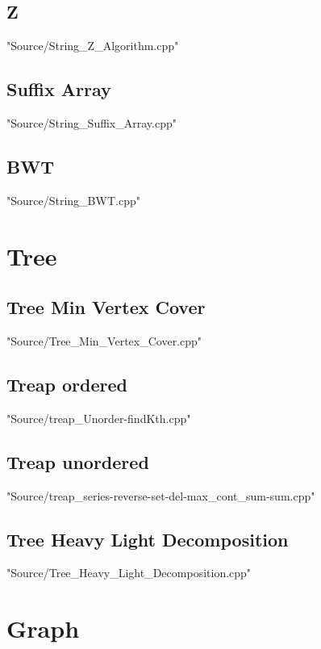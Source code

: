 \documentclass [10pt,twocolumn,oneside]{article}
\begin{document}
\subsection{Z}
 {"Source/String_Z_Algorithm.cpp"}

\subsection{Suffix Array}
 {"Source/String_Suffix_Array.cpp"}

\subsection{BWT}
 {"Source/String_BWT.cpp"}





\section{Tree}
\subsection{Tree Min Vertex Cover}
 {"Source/Tree_Min_Vertex_Cover.cpp"}

\subsection{Treap ordered}
 {"Source/treap_Unorder-findKth.cpp"}

\subsection{Treap unordered}
 {"Source/treap_series-reverse-set-del-max_cont_sum-sum.cpp"}

\subsection{Tree Heavy Light Decomposition}
 {"Source/Tree_Heavy_Light_Decomposition.cpp"}





\section{Graph}
\end{document}
